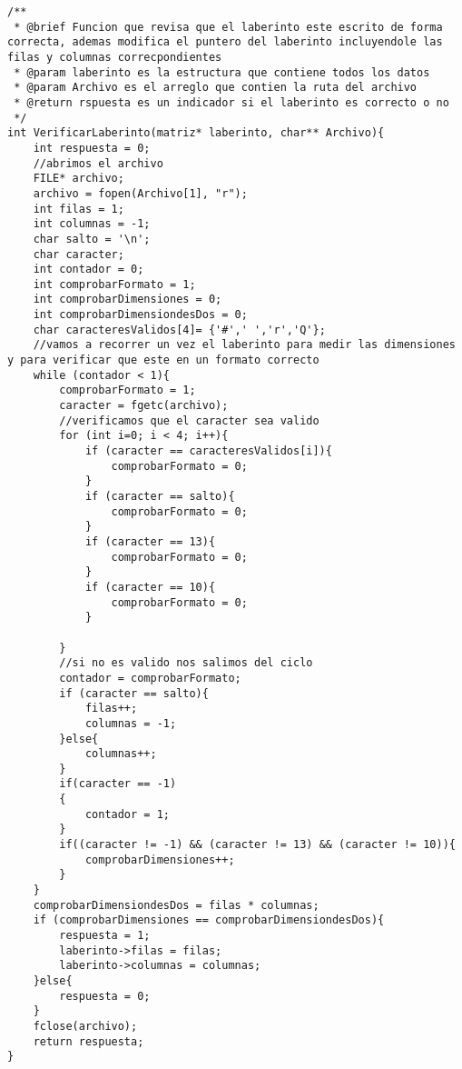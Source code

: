 \begin{verbatim}
/**
 * @brief Funcion que revisa que el laberinto este escrito de forma correcta, ademas modifica el puntero del laberinto incluyendole las filas y columnas correcpondientes
 * @param laberinto es la estructura que contiene todos los datos
 * @param Archivo es el arreglo que contien la ruta del archivo
 * @return rspuesta es un indicador si el laberinto es correcto o no
 */
int VerificarLaberinto(matriz* laberinto, char** Archivo){
    int respuesta = 0;
    //abrimos el archivo
    FILE* archivo;
    archivo = fopen(Archivo[1], "r");
    int filas = 1;
    int columnas = -1;
    char salto = '\n';
    char caracter;
    int contador = 0;
    int comprobarFormato = 1;
    int comprobarDimensiones = 0;
    int comprobarDimensiondesDos = 0;
    char caracteresValidos[4]= {'#',' ','r','Q'};
    //vamos a recorrer un vez el laberinto para medir las dimensiones y para verificar que este en un formato correcto
    while (contador < 1){
        comprobarFormato = 1;
        caracter = fgetc(archivo);
        //verificamos que el caracter sea valido
        for (int i=0; i < 4; i++){
            if (caracter == caracteresValidos[i]){
                comprobarFormato = 0;
            }
            if (caracter == salto){
                comprobarFormato = 0;
            }
            if (caracter == 13){
                comprobarFormato = 0;
            }
            if (caracter == 10){
                comprobarFormato = 0;
            }
        
        }
        //si no es valido nos salimos del ciclo
        contador = comprobarFormato;
        if (caracter == salto){
            filas++;
            columnas = -1;
        }else{
            columnas++;
        }
        if(caracter == -1)
        {
            contador = 1;
        }
        if((caracter != -1) && (caracter != 13) && (caracter != 10)){
            comprobarDimensiones++;
        }
    }
    comprobarDimensiondesDos = filas * columnas;
    if (comprobarDimensiones == comprobarDimensiondesDos){
        respuesta = 1;
        laberinto->filas = filas;
        laberinto->columnas = columnas;
    }else{
        respuesta = 0;
    }
    fclose(archivo);
    return respuesta;
}
\end{verbatim}
\newpage


